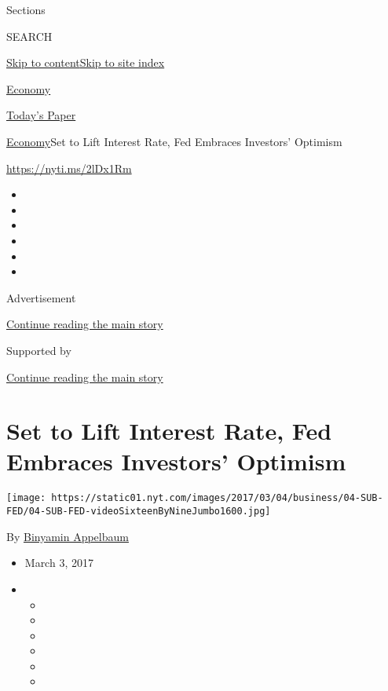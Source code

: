 Sections

SEARCH

\protect\hyperlink{site-content}{Skip to
content}\protect\hyperlink{site-index}{Skip to site index}

\href{https://www.nytimes.com/section/business/economy}{Economy}

\href{https://myaccount.nytimes.com/auth/login?response_type=cookie\&client_id=vi}{}

\href{https://www.nytimes.com/section/todayspaper}{Today's Paper}

\href{/section/business/economy}{Economy}\textbar{}Set to Lift Interest
Rate, Fed Embraces Investors' Optimism

\url{https://nyti.ms/2lDx1Rm}

\begin{itemize}
\item
\item
\item
\item
\item
\item
\end{itemize}

Advertisement

\protect\hyperlink{after-top}{Continue reading the main story}

Supported by

\protect\hyperlink{after-sponsor}{Continue reading the main story}

\hypertarget{set-to-lift-interest-rate-fed-embraces-investors-optimism}{%
\section{Set to Lift Interest Rate, Fed Embraces Investors'
Optimism}\label{set-to-lift-interest-rate-fed-embraces-investors-optimism}}

\texttt{[image: https://static01.nyt.com/images/2017/03/04/business/04-SUB-FED/04-SUB-FED-videoSixteenByNineJumbo1600.jpg]}

By \href{http://www.nytimes.com/by/binyamin-appelbaum}{Binyamin
Appelbaum}

\begin{itemize}
\item
  March 3, 2017
\item
  \begin{itemize}
  \item
  \item
  \item
  \item
  \item
  \item
  \end{itemize}
\end{itemize}

